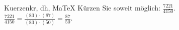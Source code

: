 \begin{MAufgabe}{Kuerzen}{kr, dh, MaTeX}
K\"urzen Sie soweit m\"oglich: $\frac{7221}{4150}$.\\ 
\ifLsg\MLoesung
\quad $\frac{7221}{4150}=\frac{(83)\cdot(87)}{(83)\cdot(50)}=\frac{87}{50}$.\else\relax\fi
 \end{MAufgabe}